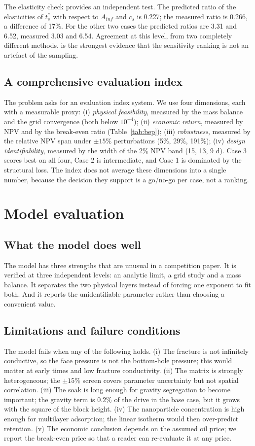 \documentclass{swmcmthesis}
\begin{document}
The elasticity check provides an independent test. The predicted ratio of the elasticities of $t_s^\ast$ with respect to $A_{inf}$ and $c_{s}$ is 0.227; the measured ratio is 0.266, a difference of 17\%. For the other two cases the predicted ratios are 3.31 and 6.52, measured 3.03 and 6.54. Agreement at this level, from two completely different methods, is the strongest evidence that the sensitivity ranking is not an artefact of the sampling.

\subsection{A comprehensive evaluation index}
The problem asks for an evaluation index system. We use four dimensions, each with a measurable proxy: (i) \emph{physical feasibility}, measured by the mass balance and the grid convergence (both below $10^{-4}$); (ii) \emph{economic return}, measured by NPV and by the break-even ratio (Table~\ref{tab:bep}); (iii) \emph{robustness}, measured by the relative NPV span under $\pm15\%$ perturbations (5\%, 29\%, 191\%); (iv) \emph{design identifiability}, measured by the width of the 2\% NPV band (15, 13, 9 d). Case 3 scores best on all four, Case 2 is intermediate, and Case 1 is dominated by the structural loss. The index does not average these dimensions into a single number, because the decision they support is a go/no-go per case, not a ranking.

\section{Model evaluation}
\subsection{What the model does well}
The model has three strengths that are unusual in a competition paper. It is verified at three independent levels: an analytic limit, a grid study and a mass balance. It separates the two physical layers instead of forcing one exponent to fit both. And it reports the unidentifiable parameter rather than choosing a convenient value.

\subsection{Limitations and failure conditions}
The model fails when any of the following holds. (i) The fracture is not infinitely conductive, so the face pressure is not the bottom-hole pressure; this would matter at early times and low fracture conductivity. (ii) The matrix is strongly heterogeneous; the $\pm15\%$ screen covers parameter uncertainty but not spatial correlation. (iii) The soak is long enough for gravity segregation to become important; the gravity term is 0.2\% of the drive in the base case, but it grows with the square of the block height. (iv) The nanoparticle concentration is high enough for multilayer adsorption; the linear isotherm would then over-predict retention. (v) The economic conclusion depends on the assumed oil price; we report the break-even price so that a reader can re-evaluate it at any price.
\end{document}

